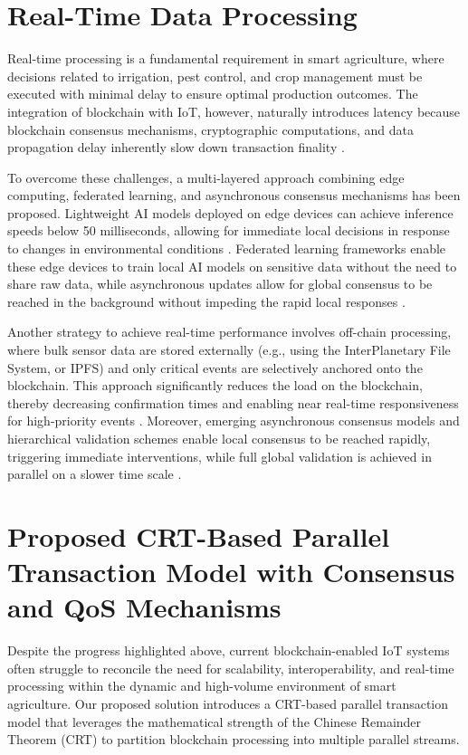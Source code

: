 \documentclass[12pt,onecolumn]{IEEEtran} %
\begin{document}
\section{Real-Time Data Processing}
Real-time processing is a fundamental requirement in smart agriculture, where decisions related to irrigation, pest control, and crop management must be executed with minimal delay to ensure optimal production outcomes. The integration of blockchain with IoT, however, naturally introduces latency because blockchain consensus mechanisms, cryptographic computations, and data propagation delay inherently slow down transaction finality \cite{huang2025digitaltraceabilityin, huang2025digitaltraceabilityin}.

To overcome these challenges, a multi-layered approach combining edge computing, federated learning, and asynchronous consensus mechanisms has been proposed. Lightweight AI models deployed on edge devices can achieve inference speeds below 50 milliseconds, allowing for immediate local decisions in response to changes in environmental conditions \cite{huang2025digitaltraceabilityin, huang2025digitaltraceabilityin}. Federated learning frameworks enable these edge devices to train local AI models on sensitive data without the need to share raw data, while asynchronous updates allow for global consensus to be reached in the background without impeding the rapid local responses \cite{huang2025digitaltraceabilityin}.

Another strategy to achieve real-time performance involves off-chain processing, where bulk sensor data are stored externally (e.g., using the InterPlanetary File System, or IPFS) and only critical events are selectively anchored onto the blockchain. This approach significantly reduces the load on the blockchain, thereby decreasing confirmation times and enabling near real-time responsiveness for high-priority events \cite{huang2025digitaltraceabilityin, huang2025digitaltraceabilityin}. Moreover, emerging asynchronous consensus models and hierarchical validation schemes enable local consensus to be reached rapidly, triggering immediate interventions, while full global validation is achieved in parallel on a slower time scale \cite{huang2025digitaltraceabilityin, huang2025digitaltraceabilityin}.

\section{Proposed CRT-Based Parallel Transaction Model with Consensus and QoS Mechanisms}
Despite the progress highlighted above, current blockchain-enabled IoT systems often struggle to reconcile the need for scalability, interoperability, and real-time processing within the dynamic and high-volume environment of smart agriculture. Our proposed solution introduces a CRT-based parallel transaction model that leverages the mathematical strength of the Chinese Remainder Theorem (CRT) to partition blockchain processing into multiple parallel streams.
\end{document}
